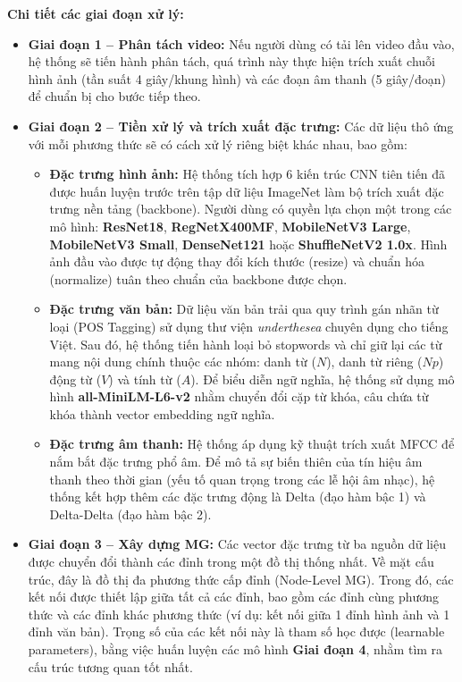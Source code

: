 \newpage
\indent\textbf{Chi tiết các giai đoạn xử lý:}
\begin{itemize}[label={--}, itemsep=3pt]
    \item \textbf{Giai đoạn 1 -- Phân tách video:} Nếu người dùng có tải lên video đầu vào, hệ thống sẽ tiến hành phân tách, quá trình này thực hiện trích xuất chuỗi hình ảnh (tần suất 4 giây/khung hình) và các đoạn âm thanh (5 giây/đoạn) để chuẩn bị cho bước tiếp theo.

    \item \textbf{Giai đoạn 2 -- Tiền xử lý và trích xuất đặc trưng:} Các dữ liệu thô ứng với mỗi phương thức sẽ có cách xử lý riêng biệt khác nhau, bao gồm:
    \begin{itemize}[label={+}, itemsep=1pt]
        \item \textbf{Đặc trưng hình ảnh:} Hệ thống tích hợp 6 kiến trúc CNN tiên tiến đã được huấn luyện trước trên tập dữ liệu ImageNet làm bộ trích xuất đặc trưng nền tảng (backbone). Người dùng có quyền lựa chọn một trong các mô hình: \textbf{ResNet18}, \textbf{RegNetX400MF}, \textbf{MobileNetV3 Large}, \textbf{MobileNetV3 Small}, \textbf{DenseNet121} hoặc \textbf{ShuffleNetV2 1.0x}. Hình ảnh đầu vào được tự động thay đổi kích thước (resize) và chuẩn hóa (normalize) tuân theo chuẩn của backbone được chọn.
        
        \item \textbf{Đặc trưng văn bản:} Dữ liệu văn bản trải qua quy trình gán nhãn từ loại (POS Tagging) sử dụng thư viện \textit{underthesea} chuyên dụng cho tiếng Việt. Sau đó, hệ thống tiến hành loại bỏ stopwords và chỉ giữ lại các từ mang nội dung chính thuộc các nhóm: danh từ ($N$), danh từ riêng ($Np$) động từ ($V$) và tính từ ($A$). Để biểu diễn ngữ nghĩa, hệ thống sử dụng mô hình \textbf{all-MiniLM-L6-v2} nhằm chuyển đổi cặp {từ khóa, câu chứa từ khóa} thành vector embedding ngữ nghĩa.
        
        \item \textbf{Đặc trưng âm thanh:} Hệ thống áp dụng kỹ thuật trích xuất MFCC để nắm bắt đặc trưng phổ âm. Để mô tả sự biến thiên của tín hiệu âm thanh theo thời gian (yếu tố quan trọng trong các lễ hội âm nhạc), hệ thống kết hợp thêm các đặc trưng động là Delta (đạo hàm bậc 1) và Delta-Delta (đạo hàm bậc 2).
    \end{itemize}

    \item \textbf{Giai đoạn 3 -- Xây dựng MG:}  Các vector đặc trưng từ ba nguồn dữ liệu được chuyển đổi thành các đỉnh trong một đồ thị thống nhất. Về mặt cấu trúc, đây là đồ thị đa phương thức cấp đỉnh (Node-Level MG). Trong đó, các kết nối được thiết lập giữa tất cả các đỉnh, bao gồm các đỉnh cùng phương thức và các đỉnh khác phương thức (ví dụ: kết nối giữa 1 đỉnh hình ảnh và 1 đỉnh văn bản). Trọng số của các kết nối này là tham số học được (learnable parameters), bằng việc huấn luyện các mô hình \textbf{Giai đoạn 4}, nhằm tìm ra cấu trúc tương quan tốt nhất.


\end{itemize}
